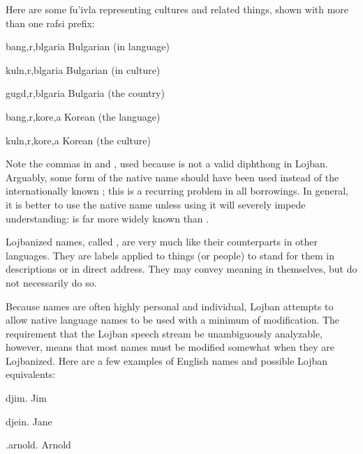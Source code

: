Here are some fu'ivla representing cultures and related things, shown with more than one rafsi prefix:
\begin{example}
bang,r,blgaria\n
Bulgarian (in language)
\end{example}

\begin{example}
kuln,r,blgaria\n
Bulgarian (in culture)
\end{example}

\begin{example}
gugd,r,blgaria\n
Bulgaria (the country)
\end{example}

\begin{example}
bang,r,kore,a\n
Korean (the language)
\end{example}

\begin{example}
kuln,r,kore,a\n
Korean (the culture)
\end{example}

Note the commas in  and , used because  is not a valid diphthong in Lojban. Arguably, some form of the native name  should have been used instead of the internationally known ; this is a recurring problem in all borrowings. In general, it is better to use the native name unless using it will severely impede understanding:  is far more widely known than .



Lojbanized names, called , are very much like their counterparts in other languages. They are labels applied to things (or people) to stand for them in descriptions or in direct address. They may convey meaning in themselves, but do not necessarily do so.

Because names are often highly personal and individual, Lojban attempts to allow native language names to be used with a minimum of modification. The requirement that the Lojban speech stream be unambiguously analyzable, however, means that most names must be modified somewhat when they are Lojbanized. Here are a few examples of English names and possible Lojban equivalents:
\begin{example}
djim.\n
Jim
\end{example}

\begin{example}
djein.\n
Jane
\end{example}

\begin{example}
.arnold.\n
Arnold
\end{example}

